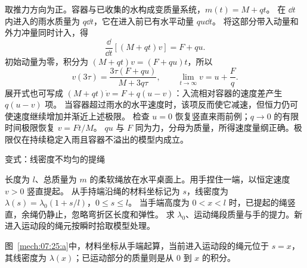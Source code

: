 {\begin{xesolution}
取推力方向为正。容器与已收集的水构成变质量系统，$m(t)=M+qt$。
在 $\dd t$ 内进入的雨水质量为 $q\dd t$，它在进入前已有水平动量 $qu\dd t$。
将这部分带入动量和外力冲量同时计入，得
\[
 \frac{\dd}{\dd t}[(M+qt)v]=F+qu.
\]
初始动量为零，积分为 $(M+qt)v=(F+qu)t$，所以
\[
 \boxed{v(3\tau)=\frac{3\tau(F+qu)}{M+3q\tau}},\qquad
 \boxed{\lim_{t\to\infty}v=u+\frac Fq}.
\]
展开式也可写成 $(M+qt)\dot v=F+q(u-v)$：入流相对容器的速度差产生 $q(u-v)$ 项。
当容器超过雨水的水平速度时，该项反而使它减速，但恒力仍可使速度继续增加并渐近上述极限。
检查 $u=0$ 恢复竖直来雨前例；$q\to0$ 的有限时间极限恢复 $v=Ft/M$。
$qu$ 与 $F$ 同为力，分母为质量，所得速度量纲正确。极限仅在持续稳定入雨且容器不溢出的模型内成立。
\end{xesolution}

\begin{origexamplebox}{变式：线密度不均匀的提绳}\label{ch07:ex:s09-3-25}

长度为 $l$、总质量为 $m$ 的柔软绳放在水平桌面上。用手捏住一端，以恒定速度 $v>0$ 竖直提起。
从手持端沿绳的材料坐标记为 $s$，线密度为 $\lambda(s)=\lambda_0(1+s/l)$，$0\le s\le l$。
当手端高度为 $0<x<l$ 时，已提起的绳竖直，余绳仍静止，忽略弯折区长度和弹性。
求 $\lambda_0$、运动绳段质量与手的提力。新进入运动段的绳元按瞬时拾取模型处理。

\begin{qualityfigure}
\label{mech:07:25:q}
\end{qualityfigure}
\end{origexamplebox}

\begin{xesolution}
\begin{qualityfigure}
\label{mech:07:25:a}
\end{qualityfigure}
图~\ref{mech:07:25:a}中，材料坐标从手端起算，当前进入运动段的绳元位于 $s=x$，其线密度为 $\lambda(x)$；已运动部分的质量则是从 $0$ 到 $x$ 的积分。


\end{xesolution}}
